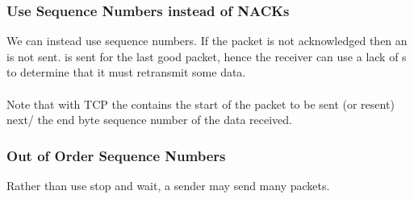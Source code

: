 \documentclass{report}
\begin{document}
            \subsubsection*{Use Sequence Numbers instead of NACKs}
                We can instead use sequence numbers. If the packet is not acknowledged then an  is not sent.  is sent for the last good packet, hence the receiver can use a lack of s to determine that it must retransmit some data.
                \\
                \\ Note that with TCP the  contains the start of the packet to be sent (or resent) next/ the end  byte sequence number of the data received.
            
            \subsubsection*{Out of Order Sequence Numbers}
                Rather than use stop and wait, a sender may send many packets.
\end{document}
